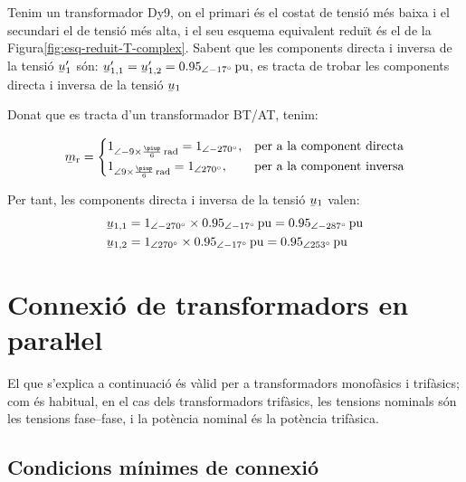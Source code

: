 \begin{exemple}
Tenim un transformador Dy9, on el primari és el costat de tensió més baixa  i el secundari el de tensió més alta, i el seu esquema equivalent reduït és el de la Figura\vref{fig:esq-reduit-T-complex}. Sabent que les components directa i inversa de la tensió $\cmplx{u}'_1$ són:
$\cmplx{u}'_{1,1}= \cmplx{u}'_{1,2} = \SIpd{0,95}{-17}{pu}$, es tracta de trobar les components directa i inversa de la tensió $\cmplx{u}_1$

    Donat que es tracta d'un transformador BT/AT, tenim:

    \[
    \cmplx{m}\ped{r} = \begin{cases}
      1_{\angle -9\times\frac{\piup}{6}\si{\,rad}} = \numpd{1}{-270}, & \text{per a la component directa}\\
      1_{\angle 9\times\frac{\piup}{6}\si{\,rad}} = \numpd{1}{ 270}, & \text{per a la component inversa}
    \end{cases}
    \]

     Per tant, les components directa i inversa de la tensió  $\cmplx{u}_1$ valen:
    \begin{align*}
    \cmplx{u}_{1,1} &= \numpd{1}{-270}\times \SIpd{0,95}{-17}{pu}  = \SIpd{0,95}{-287}{pu} \\
    \cmplx{u}_{1,2} &= \numpd{1}{ 270}\times \SIpd{0,95}{-17}{pu}  = \SIpd{0,95}{253}{pu}
    \end{align*}
\end{exemple}



\section{\texorpdfstring{Connexió de transformadors en paraŀlel}{Connexió de transformadors en paral-lel}}

El que s'explica a continuació és vàlid per a transformadors
monofàsics i trifàsics; com és habitual, en el cas dels
transformadors trifàsics, les tensions nominals són les tensions
fase--fase, i la potència nominal és la potència trifàsica.

\subsection{Condicions mínimes de connexió}

